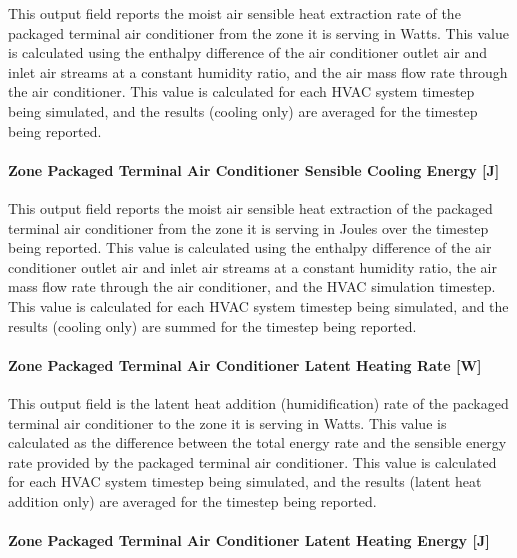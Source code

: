 This output field reports the moist air sensible heat extraction rate of the packaged terminal air conditioner from the zone it is serving in Watts. This value is calculated using the enthalpy difference of the air conditioner outlet air and inlet air streams at a constant humidity ratio, and the air mass flow rate through the air conditioner. This value is calculated for each HVAC system timestep being simulated, and the results (cooling only) are averaged for the timestep being reported.

\paragraph{Zone Packaged Terminal Air Conditioner Sensible Cooling Energy {[}J{]}}\label{zone-packaged-terminal-air-conditioner-sensible-cooling-energy-j}

This output field reports the moist air sensible heat extraction of the packaged terminal air conditioner from the zone it is serving in Joules over the timestep being reported. This value is calculated using the enthalpy difference of the air conditioner outlet air and inlet air streams at a constant humidity ratio, the air mass flow rate through the air conditioner, and the HVAC simulation timestep. This value is calculated for each HVAC system timestep being simulated, and the results (cooling only) are summed for the timestep being reported.

\paragraph{Zone Packaged Terminal Air Conditioner Latent Heating Rate {[}W{]}}\label{zone-packaged-terminal-air-conditioner-latent-heating-rate-w}

This output field is the latent heat addition (humidification) rate of the packaged terminal air conditioner to the zone it is serving in Watts. This value is calculated as the difference between the total energy rate and the sensible energy rate provided by the packaged terminal air conditioner. This value is calculated for each HVAC system timestep being simulated, and the results (latent heat addition only) are averaged for the timestep being reported.

\paragraph{Zone Packaged Terminal Air Conditioner Latent Heating Energy {[}J{]}}\label{zone-packaged-terminal-air-conditioner-latent-heating-energy-j}

